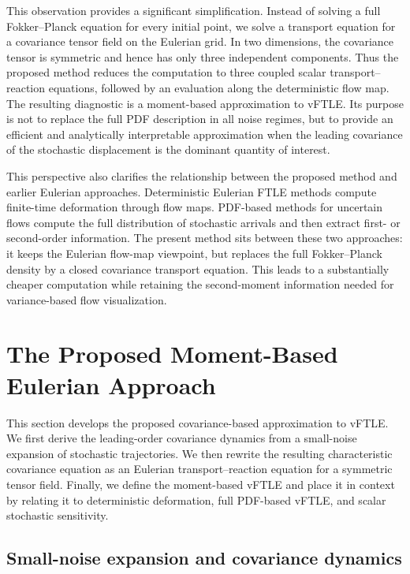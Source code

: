 \documentclass[a4paper,11pt]{article}
\numberwithin{equation}{section}
\theoremstyle{plain}
\theoremstyle{definition}
\theoremstyle{remark}
\begin{document}
This observation provides a significant simplification.  Instead of solving a full Fokker--Planck equation for every initial point, we solve a transport equation for a covariance tensor field on the Eulerian grid.  In two dimensions, the covariance tensor is symmetric and hence has only three independent components.  Thus the proposed method reduces the computation to three coupled scalar transport--reaction equations, followed by an evaluation along the deterministic flow map.  The resulting diagnostic is a moment-based approximation to vFTLE.  Its purpose is not to replace the full PDF description in all noise regimes, but to provide an efficient and analytically interpretable approximation when the leading covariance of the stochastic displacement is the dominant quantity of interest.

This perspective also clarifies the relationship between the proposed method and earlier Eulerian approaches.  Deterministic Eulerian FTLE methods compute finite-time deformation through flow maps.  PDF-based methods for uncertain flows compute the full distribution of stochastic arrivals and then extract first- or second-order information.  The present method sits between these two approaches: it keeps the Eulerian flow-map viewpoint, but replaces the full Fokker--Planck density by a closed covariance transport equation.  This leads to a substantially cheaper computation while retaining the second-moment information needed for variance-based flow visualization.


\section{The Proposed Moment-Based Eulerian Approach}
\label{sec:proposed}

This section develops the proposed covariance-based approximation to vFTLE.  We first derive the leading-order covariance dynamics from a small-noise expansion of stochastic trajectories.  We then rewrite the resulting characteristic covariance equation as an Eulerian transport--reaction equation for a symmetric tensor field.  Finally, we define the moment-based vFTLE and place it in context by relating it to deterministic deformation, full PDF-based vFTLE, and scalar stochastic sensitivity.

\subsection{Small-noise expansion and covariance dynamics}
\end{document}
